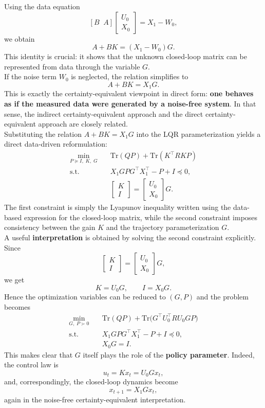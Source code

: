 Using the data equation
\[
[B\;\;A]
\begin{bmatrix}
U_0\\[0.3em]
X_0
\end{bmatrix}
=
X_1-W_0,
\]
we obtain
\begin{equation}
A+BK = (X_1-W_0)G.
\label{eq:closedloopdata}
\end{equation}
This identity is crucial: it shows that the unknown closed-loop matrix can be represented from
data through the variable $G$.\\
If the noise term $W_0$ is neglected, the relation simplifies to
\[
A+BK = X_1G.
\]
This is exactly the certainty-equivalent viewpoint in direct form: \textbf{one behaves as if the measured
data were generated by a noise-free system}. In that sense, the indirect certainty-equivalent
approach and the direct certainty-equivalent approach are closely related.\\

Substituting the relation $A+BK=X_1G$ into the LQR parameterization yields a direct
data-driven reformulation:
\[
\begin{aligned}
\min_{P \succeq I,\;K,\;G}\quad
& \text{Tr}(QP)+\text{Tr}(K^\top RKP)\\
\text{s.t.}\quad
& X_1GPG^\top X_1^\top - P + I \preceq 0,\\
& \begin{bmatrix}
K\\[0.3em]
I
\end{bmatrix}
=
\begin{bmatrix}
U_0\\[0.3em]
X_0
\end{bmatrix}G.
\end{aligned}
\]
The first constraint is simply the Lyapunov inequality written using the data-based expression
for the closed-loop matrix, while the second constraint imposes consistency between the gain
$K$ and the trajectory parameterization $G$.\\
A useful \textbf{interpretation} is obtained by solving the second constraint explicitly. Since
\[
\begin{bmatrix}
K\\[0.3em]
I
\end{bmatrix}
=
\begin{bmatrix}
U_0\\[0.3em]
X_0
\end{bmatrix}G,
\]
we get
\[
K = U_0G,
\qquad
I = X_0G.
\]
Hence the optimization variables can be reduced to $(G,P)$ and the problem becomes
\[
\begin{aligned}
\min_{G,\;P \succ 0}\quad
& \text{Tr}(QP)+\text{Tr}\!\big(G^\top U_0^\top R U_0 G P\big)\\
\text{s.t.}\quad
& X_1GPG^\top X_1^\top - P + I \preceq 0,\\
& X_0G = I.
\end{aligned}
\]
This makes clear that $G$ itself plays the role of the \textbf{policy parameter}. Indeed, the control law is
\[
u_t = Kx_t = U_0Gx_t,
\]
and, correspondingly, the closed-loop dynamics become
\[
x_{t+1} = X_1Gx_t,
\]
again in the noise-free certainty-equivalent interpretation.

